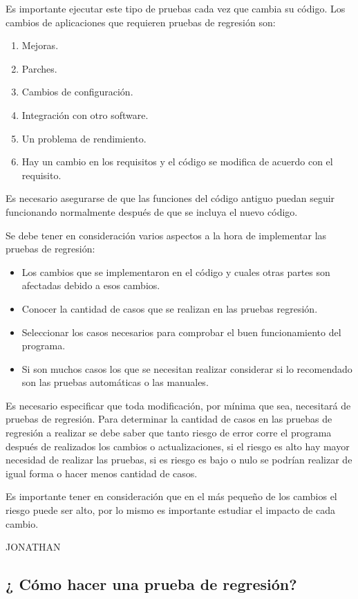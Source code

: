 \documentclass[conference]{IEEEtran}
\begin{document}
Es importante ejecutar este tipo de pruebas cada vez que cambia su código. Los cambios de aplicaciones que requieren pruebas de regresión son:

\begin{enumerate}[1.]
\item Mejoras.
\item Parches.
\item Cambios de configuración.
\item Integración con otro software.
\item Un problema de rendimiento.
\item Hay un cambio en los requisitos y el código se modifica de acuerdo con el requisito.
\end{enumerate}

Es necesario asegurarse de que las funciones del código antiguo puedan seguir funcionando normalmente después de que se incluya el nuevo código.

Se debe tener en consideración varios aspectos a la hora de implementar las pruebas de regresión:

\begin{itemize}
\item Los cambios que se implementaron en el código y cuales otras partes son afectadas debido a esos cambios.
\item Conocer la cantidad de casos que se realizan en las pruebas regresión.
\item Seleccionar los casos necesarios para comprobar el buen funcionamiento del programa.
\item Si son muchos casos los que se necesitan realizar considerar si lo recomendado son las pruebas automáticas o las manuales.
\end{itemize}

Es necesario especificar que toda modificación, por mínima que sea, necesitará de pruebas de regresión. 
Para determinar la cantidad de casos en las pruebas de regresión a realizar se debe saber que tanto riesgo de error corre el programa después de realizados los cambios o actualizaciones, si el riesgo es alto hay mayor necesidad de realizar las pruebas, si es riesgo es bajo o nulo se podrían realizar de igual forma o hacer menos cantidad de casos.

Es importante tener en consideración que en el más pequeño de los cambios el riesgo puede ser alto, por lo mismo es importante estudiar el impacto de cada cambio.


JONATHAN
\subsection{¿ Cómo hacer una prueba de regresión?}
\end{document}
